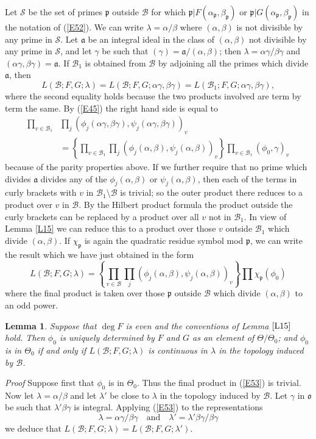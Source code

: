 \documentclass[12pt]{article}
\def\fa{{\mathfrak a}}
\def\fo{{\mathfrak o}}
\def\fp{{\mathfrak p}}
\def\ga{{\alpha}}
\def\gb{{\beta}}
\def\gg{{\gamma}}
\def\gl{{\lambda}}
\def\gT{{\Theta}}
\def\sB{{\mathcal B}}
\def\sS{{\mathcal S}}
\def\beq{\begin{equation} \label}
\def\ble{\begin{lemma} \label}
\def\ele{\end{lemma}}
\newtheorem{lemma}{Lemma}
\begin{document}
Let $\sS$ be the set of primes $\fp$ outside $\sB$ for which $\fp|F(\ga_\fp,\gb_\fp)$
or $\fp|G(\ga_\fp,\gb_\fp)$ in the notation of (\ref{E52}). We can write
$\gl=\ga/\gb$ where $(\ga,\gb)$ is not divisible by any prime in $\sS$.
Let $\fa$ be an integral ideal in the class of $(\ga,\gb)$ not
divisible by any prime in $\sS$, and let $\gg$ be such that $(\gg)=\fa/(\ga,\gb)$;
then $\gl=\ga\gg/\gb\gg$ and $(\ga\gg,\gb\gg)=\fa$. If $\sB_1$ is obtained from $\sB$
by adjoining all the primes which divide $\fa$, then
\[ L(\sB;F,G;\gl)=L(\sB;F,G;\ga\gg,\gb\gg)=L(\sB_1;F,G;\ga\gg,\gb\gg), \]
where the second equality holds because the two products involved are term
by term the same. By (\ref{E45}) the right hand side is
equal to
\begin{align*}
\prod_{v\in\sB_1} & \prod_j(\phi_j(\ga\gg,\gb\gg),\psi_j(\ga\gg,\gb\gg))_v  \\
 & =\left\{\prod_{v\in\sB_1}\prod_j(\phi_j(\ga,\gb),\psi_j(\ga,\gb))_v\right\}
\prod_{v\in\sB_1}(\phi_0,\gg)_v
\end{align*}
because of the parity properties above. If we further require that no prime
which divides $\fa$ divides any of the $\phi_j(\ga,\gb)$ or $\psi_j(\ga,\gb)$,
then each of the terms in curly brackets with $v$ in $\sB_1\setminus\sB$ is
trivial;
so the outer product there reduces to a product over $v$ in $\sB$. By the
Hilbert product formula the product outside the curly brackets can be
replaced by a product over all $v$ not in $\sB_1$. In view of Lemma \ref{L15}
we can reduce this to a product over those $v$ outside $\sB_1$ which divide
$(\ga,\gb)$. If $\chi_\fp$ is again the quadratic residue symbol mod $\fp$, we
can write the result which we have just obtained in the form
\beq{E53} L(\sB;F,G;\gl)=\left\{\prod_{v\in\sB}\prod_j(\phi_j(\ga,\gb),
\psi_j(\ga,\gb))_v\right\}\prod\chi_\fp(\phi_0) \end{equation}
where the final product is taken over those $\fp$ outside $\sB$ which divide
$(\ga,\gb)$ to an odd power.
\ble{L18} Suppose that $\deg F$ is even and the conventions of
Lemma $\ref{L15}$ hold. Then $\phi_0$ is uniquely determined by $F$ and $G$
as an element of $\gT/\gT_0$; and $\phi_0$ is in $\gT_0$ if and only if
$L(\sB;F,G;\gl)$ is continuous in $\gl$ in the topology induced by $\sB$.
\ele
\emph{Proof} Suppose first that $\phi_0$ is in $\gT_0$. Thus the final
product in (\ref{E53}) is trivial. Now let $\gl=\ga/\gb$ and
let $\gl'$ be close to $\gl$ in the topology induced by $\sB$. Let $\gg$
in $\fo$ be such that $\gl'\gb\gg$ is integral. Applying (\ref{E53}) to the
representations
\[ \gl=\ga\gg/\gb\gg \quad {\mathrm{and}} \quad \gl'=\gl'\gb\gg/\gb\gg \]
we deduce that $L(\sB;F,G;\gl)=L(\sB;F,G;\gl')$.
\end{document}
